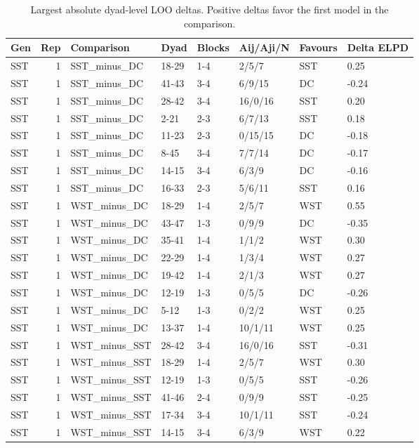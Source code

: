 \begin{table}[!h]
\centering
\caption{Largest absolute dyad-level LOO deltas. Positive deltas favor the first model in the comparison.}
\centering
\begin{tabular}[t]{lrllllll}
\toprule
Gen & Rep & Comparison & Dyad & Blocks & Aij/Aji/N & Favours & Delta ELPD\\
\midrule
SST & 1 & SST_minus_DC & 18-29 & 1-4 & 2/5/7 & SST & 0.25\\
SST & 1 & SST_minus_DC & 41-43 & 3-4 & 6/9/15 & DC & -0.24\\
SST & 1 & SST_minus_DC & 28-42 & 3-4 & 16/0/16 & SST & 0.20\\
SST & 1 & SST_minus_DC & 2-21 & 2-3 & 6/7/13 & SST & 0.18\\
SST & 1 & SST_minus_DC & 11-23 & 2-3 & 0/15/15 & DC & -0.18\\
\addlinespace
SST & 1 & SST_minus_DC & 8-45 & 3-4 & 7/7/14 & DC & -0.17\\
SST & 1 & SST_minus_DC & 14-15 & 3-4 & 6/3/9 & DC & -0.16\\
SST & 1 & SST_minus_DC & 16-33 & 2-3 & 5/6/11 & SST & 0.16\\
SST & 1 & WST_minus_DC & 18-29 & 1-4 & 2/5/7 & WST & 0.55\\
SST & 1 & WST_minus_DC & 43-47 & 1-3 & 0/9/9 & DC & -0.35\\
\addlinespace
SST & 1 & WST_minus_DC & 35-41 & 1-4 & 1/1/2 & WST & 0.30\\
SST & 1 & WST_minus_DC & 22-29 & 1-4 & 1/3/4 & WST & 0.27\\
SST & 1 & WST_minus_DC & 19-42 & 1-4 & 2/1/3 & WST & 0.27\\
SST & 1 & WST_minus_DC & 12-19 & 1-3 & 0/5/5 & DC & -0.26\\
SST & 1 & WST_minus_DC & 5-12 & 1-3 & 0/2/2 & WST & 0.25\\
\addlinespace
SST & 1 & WST_minus_DC & 13-37 & 1-4 & 10/1/11 & WST & 0.25\\
SST & 1 & WST_minus_SST & 28-42 & 3-4 & 16/0/16 & SST & -0.31\\
SST & 1 & WST_minus_SST & 18-29 & 1-4 & 2/5/7 & WST & 0.30\\
SST & 1 & WST_minus_SST & 12-19 & 1-3 & 0/5/5 & SST & -0.26\\
SST & 1 & WST_minus_SST & 41-46 & 2-4 & 0/9/9 & SST & -0.25\\
\addlinespace
SST & 1 & WST_minus_SST & 17-34 & 3-4 & 10/1/11 & SST & -0.24\\
SST & 1 & WST_minus_SST & 14-15 & 3-4 & 6/3/9 & WST & 0.22\\

\end{tabular}
\end{table}
